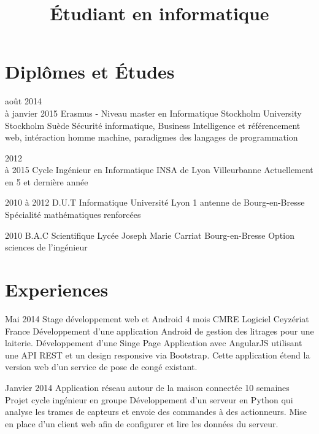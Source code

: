 \documentclass[10pt,a4paper]{moderncv}
\title{Étudiant en informatique}
\begin{document}
\maketitle
\pagestyle{empty}


\section{Diplômes et Études}

\cventry
	{août 2014\\à janvier 2015}
	{Erasmus - Niveau master en Informatique}
	{Stockholm University}
	{Stockholm}
	{Suède}
	{Sécurité informatique, Business Intelligence et référencement web, intéraction homme machine, paradigmes des langages de programmation}

\cventry
	{2012\\à 2015}
	{Cycle Ingénieur en Informatique}
	{INSA de Lyon}
	{Villeurbanne}
	{}
	{Actuellement en 5 et dernière année}

\cventry
	{2010 à 2012}
	{D.U.T Informatique}
	{Université Lyon 1}
	{antenne de Bourg-en-Bresse}
	{}
	{Spécialité mathématiques renforcées}

\cventry
	{2010}
	{B.A.C Scientifique}
	{Lycée Joseph Marie Carriat}
	{Bourg-en-Bresse}
	{}
	{Option sciences de l'ingénieur}


\section{Experiences}

\cventry
	{Mai 2014}
	{Stage développement web et Android}
	{4 mois}
	{CMRE Logiciel}
	{Ceyzériat France}
	{Développement d'une application Android de gestion des litrages pour une laiterie. Développement d'une Singe Page Application avec AngularJS utilisant une API REST et un design responsive via Bootstrap. Cette application étend la version web d'un service de pose de congé existant.}

\cventry
	{Janvier 2014}
	{Application réseau autour de la maison connectée}
	{10 semaines}
	{}
	{Projet cycle ingénieur en groupe}
	{Développement d'un serveur en Python qui analyse les trames de capteurs et envoie des commandes à des actionneurs. Mise en place d'un client web afin de configurer et lire les données du serveur.}
\end{document}
